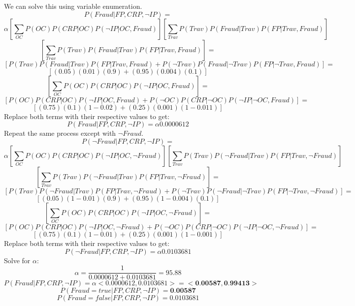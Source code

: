 \documentclass{article}
\begin{document}
\\\\
We can solve this using variable enumeration.\\
$$P(Fraud | FP, CRP, \neg IP)=$$
$$\alpha [\sum_{OC}P(OC)P(CRP|OC)P(\neg IP|OC,Fraud)][\sum_{Trav}P(Trav)P(Fraud|Trav)P(FP|Trav,Fraud)]$$
$$[\sum_{Trav}P(Trav)P(Fraud|Trav)P(FP|Trav,Fraud)] = $$
$$[P(Trav)P(Fraud|Trav)P(FP|Trav,Fraud)+P(\neg Trav)P(Fraud| \neg Trav)P(FP|\neg Trav, Fraud)] = $$
$$[(0.05)(0.01)(0.9)+(0.95)(0.004)(0.1)]$$
$$[\sum_{OC}P(OC)P(CRP|OC)P(\neg IP|OC,Fraud)] = $$
$$[P(OC)P(CRP|OC)P(\neg IP|OC, Fraud)+P(\neg OC)P(CRP|\neg OC)P(\neg IP|\neg OC, Fraud)] = $$
$$[(0.75)(0.1)(1-0.02)+(0.25)(0.001)(1-0.011)]$$
Replace both terms with their respective values to get:
$$P(Fraud | FP, CRP, \neg IP)= \alpha 0.0000612$$
Repeat the same process except with $\neg Fraud$.
$$P(\neg Fraud | FP, CRP, \neg IP)=$$
$$\alpha [\sum_{OC}P(OC)P(CRP|OC)P(\neg IP|OC,\neg Fraud)][\sum_{Trav}P(Trav)P(\neg Fraud|Trav)P(FP|Trav,\neg Fraud)]$$
$$[\sum_{Trav}P(Trav)P(\neg Fraud|Trav)P(FP|Trav,\neg Fraud)] = $$
$$[P(Trav)P(\neg Fraud|Trav)P(FP|Trav,\neg Fraud)+P(\neg Trav)P(\neg Fraud| \neg Trav)P(FP|\neg Trav, \neg Fraud)] = $$
$$[(0.05)(1-0.01)(0.9)+(0.95)(1-0.004)(0.1)]$$
$$[\sum_{OC}P(OC)P(CRP|OC)P(\neg IP|OC,\neg Fraud)] = $$
$$[P(OC)P(CRP|OC)P(\neg IP|OC, \neg Fraud)+P(\neg OC)P(CRP|\neg OC)P(\neg IP|\neg OC, \neg Fraud)] = $$
$$[(0.75)(0.1)(1-0.01)+(0.25)(0.001)(1-0.001)]$$
Replace both terms with their respective values to get:
$$P(\neg Fraud | FP, CRP, \neg IP)= \alpha 0.0103681$$
Solve for $\alpha$:
$$ \alpha = \frac{1}{0.0000612+0.0103681} = 95.88$$
$$ P(Fraud | FP, CRP, \neg IP) = \alpha <0.0000612, 0.0103681> = <\textbf{0.00587}, \textbf{0.99413}>$$
$$ P(Fraud = true | FP, CRP, \neg IP) = \textbf{0.00587} $$
$$ P(Fraud = false | FP, CRP, \neg IP) = 0.0103681 $$
\end{document}
